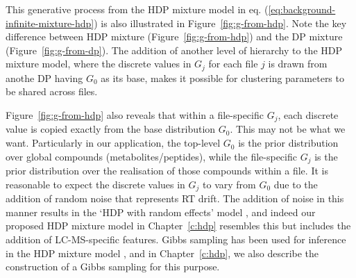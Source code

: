 This generative process from the HDP mixture model in eq. (\ref{eq:background-infinite-mixture-hdp}) is also illustrated in Figure~\ref{fig:g-from-hdp}. Note the key difference between HDP mixture (Figure~\ref{fig:g-from-hdp}) and the DP mixture (Figure~\ref{fig:g-from-dp}). The addition of another level of hierarchy to the HDP mixture model, where the discrete values in $G_{j}$ for each file $j$ is drawn from anothe DP having $G_{0}$ as its base, makes it possible for clustering parameters to be shared across files. 

Figure~\ref{fig:g-from-hdp} also reveals that within a file-specific $G_j$, each discrete value is copied exactly from the base distribution $G_0$. This may not be what we want. Particularly in our application, the top-level $G_0$ is the prior distribution over global compounds (metabolites/peptides), while the file-specific $G_j$ is the prior distribution over the realisation of those compounds within a file. It is reasonable to expect the discrete values in $G_j$ to vary from $G_0$ due to the addition of random noise that represents RT drift. The addition of noise in this manner results in the `HDP with random effects' model \cite{kim2006hierarchical}, and indeed our proposed HDP mixture model in Chapter~\ref{c:hdp} resembles this but includes the addition of LC-MS-specific features. Gibbs sampling has been used for inference in the HDP mixture model \cite{teh2005hierarchical}, and in Chapter~\ref{c:hdp}, we also describe the construction of a Gibbs sampling for this purpose.


